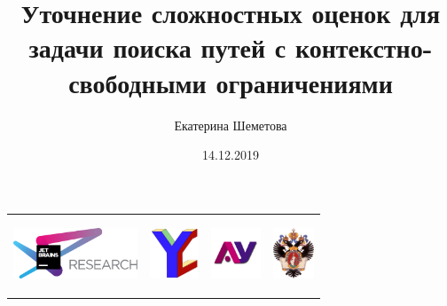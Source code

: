 \documentclass{beamer}
\title[Effective CFL-reachability]{Уточнение сложностных оценок для задачи поиска путей с контекстно-свободными ограничениями}
\institute[]{ JetBrains Research, Programming Languages and Tools Lab  \\
    СПбАУ, СПбГУ }
\author[Екатерина Шеметова]{Екатерина Шеметова}
\date{14.12.2019}
\begin{document}
 

{
\begin{frame}[fragile]
  \begin{tabular}{p{2.0cm} p{4.5cm} p{1.5cm} p{1cm}}
   \begin{center}
      \includegraphics[height=1.5cm]{pictures/jetbrainsResearch.pdf}
    \end{center}
    &
    \begin{center}
      \includegraphics[height=1.5cm]{pictures/YC_logo.pdf}
    \end{center}
    &
    \begin{center}
      \includegraphics[height=1.5cm]{pictures/au-logo-full.png}
    \end{center}
    &
    \begin{center}
      \includegraphics[height=1.5cm]{pictures/SPbGU_Logo.png}
    \end{center}
  \end{tabular}
  \titlepage
\end{frame}
}
\end{document}
